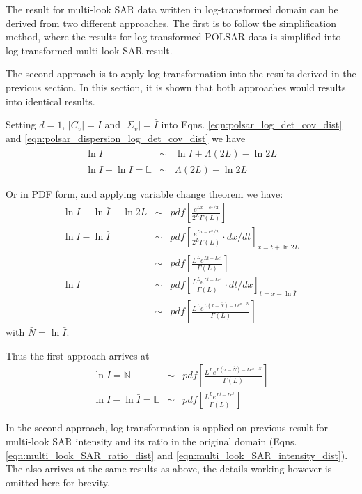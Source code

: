 The result for multi-look SAR data written in log-transformed domain can be derived from two different approaches.
The first is to follow the simplification method, where the results for log-transformed POLSAR data is simplified into log-transformed multi-look SAR result.

The second approach is to apply log-transformation into the results derived in the previous section.
In this section, it is shown that both approaches would results into identical results.

Setting $d=1$, $|C_v|=I$ and $|\Sigma_v|=\bar{I}$ into Eqns. \ref{eqn:polsar_log_det_cov_dist} and \ref{eqn:polsar_dispersion_log_det_cov_dist}
we have
\begin{eqnarray*}
  \ln{I} &\sim& \ln{\bar{I}} + \Lambda(2L) - \ln{2L}  \\
  \ln{I} - \ln{\bar{I}} = \mathbb{L} &\sim& \Lambda(2L) - \ln{2L} 
\end{eqnarray*}

Or in PDF form, and applying variable change theorem we have:
\begin{eqnarray*}
  \ln{I} - \ln{\bar{I}} + \ln{2L} &\sim& pdf \left[ \frac{e^{Lx-e^x/2}}{2^L \Gamma(L)} \right] \\
  \ln{I} - \ln{\bar{I}} &\sim& pdf \left[ \frac{e^{Lx-e^x/2}}{2^L \Gamma(L)} \cdot dx/dt \right]_{x=t+\ln{2L}} \\
   &\sim& pdf \left[ \frac{L^Le^{Lt-Le^t}}{ \Gamma(L)}  \right] \\
  \ln{I} &\sim&  pdf \left[ \frac{L^Le^{Lt-Le^t}}{ \Gamma(L)} \cdot dt/dx \right]_{t=x-\ln{\bar{I}}} \\
 &\sim&  pdf \left[ \frac{L^Le^{L(x-\bar{N})-Le^{x-\bar{N}}}}{ \Gamma(L)} \right] 
\end{eqnarray*}
with $\bar{N} = \ln{\bar{I}}$.

Thus the first approach arrives at
\begin{eqnarray}
   \ln{I} = \mathbb{N} &\sim&  pdf \left[ \frac{L^Le^{L(x-\bar{N})-Le^{x-\bar{N}}}}{ \Gamma(L)} \right] \\
   \ln{I} - \ln{\bar{I}} = \mathbb{L} &\sim& pdf \left[ \frac{L^Le^{Lt-Le^t}}{ \Gamma(L)}  \right]  
\end{eqnarray}

In the second approach, log-transformation is applied on previous result for multi-look SAR intensity and its ratio in the original domain (Eqns. \ref{eqn:multi_look_SAR_ratio_dist} and \ref{eqn:multi_look_SAR_intensity_dist}).
The also arrives at the same results as above, the details working however is omitted here for brevity.

